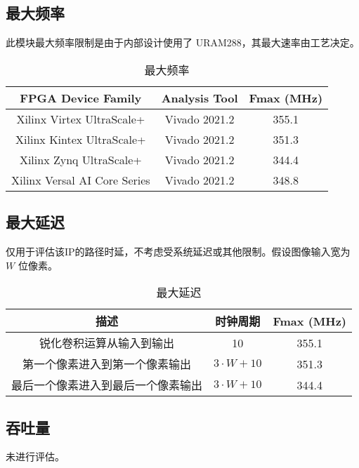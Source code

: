 \documentclass[12pt, a4paper, oneside]{ctexbook}
\begin{document}
		\subsection{最大频率}
		此模块最大频率限制是由于内部设计使用了 URAM288，其最大速率由工艺决定。
		\begin{table}[h]
			\centering
			\begin{tabular}{|c|c|c|}
				\hline
				\textbf{FPGA Device Family}  & \textbf{Analysis Tool} & \textbf{Fmax (MHz)} \\ \hline
				Xilinx Virtex UltraScale+    & Vivado 2021.2          & 355.1               \\ \hline
				Xilinx Kintex UltraScale+    & Vivado 2021.2          & 351.3               \\ \hline
				Xilinx Zynq UltraScale+      & Vivado 2021.2          & 344.4               \\ \hline
				Xilinx Versal AI Core Series & Vivado 2021.2          & 348.8               \\ \hline
			\end{tabular}
		\caption{最大频率}
		\end{table}	
		\newpage
		\subsection{最大延迟}
		仅用于评估该IP的路径时延，不考虑受系统延迟或其他限制。假设图像输入宽为 $W$ 位像素。
		\begin{table}[htb]
			\centering
			\begin{tabular}{|c|c|c|}
				\hline
				\textbf{描述}       & \textbf{时钟周期}   & \textbf{Fmax (MHz)} \\ \hline
				锐化卷积运算从输入到输出      & 10              & 355.1               \\ \hline
				第一个像素进入到第一个像素输出   & $3\cdot W+10$   & 351.3               \\ \hline
				最后一个像素进入到最后一个像素输出 & $3\cdot W + 10$ & 344.4               \\ \hline
			\end{tabular}
		\caption{最大延迟}
		\end{table}
		\subsection{吞吐量}
		未进行评估。
\end{document}
